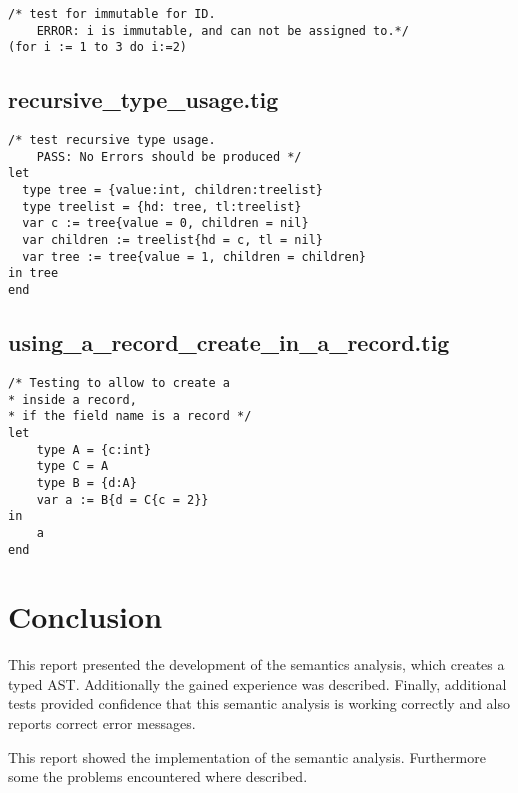 \documentclass{article}
\begin{document}
\begin{lstlisting}[frame=single]
/* test for immutable for ID.
	ERROR: i is immutable, and can not be assigned to.*/
(for i := 1 to 3 do i:=2)
\end{lstlisting}

\subsection{recursive\_type\_usage.tig}

\begin{lstlisting}[frame=single]
 /* test recursive type usage.
	PASS: No Errors should be produced */
let
  type tree = {value:int, children:treelist}
  type treelist = {hd: tree, tl:treelist}
  var c := tree{value = 0, children = nil}
  var children := treelist{hd = c, tl = nil}
  var tree := tree{value = 1, children = children}
in tree
end
\end{lstlisting}

\subsection{using\_a\_record\_create\_in\_a\_record.tig}

\begin{lstlisting}[frame=single]
/* Testing to allow to create a
* inside a record,
* if the field name is a record */
let
	type A = {c:int}
	type C = A
	type B = {d:A}
	var a := B{d = C{c = 2}}
in
	a
end
\end{lstlisting}

\section{Conclusion}
This report presented the development of the semantics analysis, which creates a typed AST. Additionally the gained experience was described. Finally, additional tests provided confidence that this semantic analysis is working correctly and also reports correct error messages.

This report showed the implementation of the semantic analysis. Furthermore some the problems encountered where described. 
\end{document}
